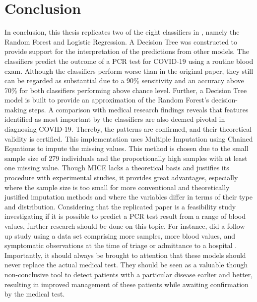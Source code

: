 \section{Conclusion}
In conclusion, this thesis replicates two of the eight classifiers in 
\cite{RN127}, namely the Random Forest and Logistic Regression. A Decision Tree 
was constructed to provide support for the interpretation of the predictions 
from other models. The classifiers predict the outcome of a PCR test for 
COVID-19 using a routine blood exam. Although the classifiers perform worse 
than in the 
original paper, they still can be regarded as substantial due to a 90\% 
sensitivity and an accuracy above 70\% for both classifiers performing above 
chance level.
Further, a Decision Tree model is built to provide an approximation of the 
Random Forest's decision-making steps.
A comparison with medical research findings reveals that features 
identified as most important by the classifiers are also deemed pivotal in 
diagnosing COVID-19. Thereby, the patterns are confirmed, and their theoretical 
validity is certified.
This implementation uses Multiple Imputation using Chained Equations to impute 
the missing values. This method is chosen due to the small sample size of 279 
individuals and the proportionally high samples with at least one 
missing value. Though MICE lacks a theoretical basis and justifies its 
procedure with experimental studies, it provides great advantages, especially 
where the sample size is too small for more conventional and theoretically 
justified imputation methods and where the variables differ in terms of their 
type and distribution.
Considering that the replicated paper is a feasibility study investigating if 
it is 
possible to predict a PCR test result from a range of blood values, further 
research should be done on this topic. For instance, \citeauthor{RN127} did a 
follow-up study using a data set comprising more samples, more blood values, 
and symptomatic observations at the time of triage or admittance to a hospital 
\cite{RN179}.
Importantly, it should always be brought to attention that these 
models should never replace the actual medical test. They should be seen as a 
valuable though non-conclusive tool to detect patients with a particular 
disease earlier and better, resulting in improved management of these patients 
while awaiting confirmation by the medical test.

